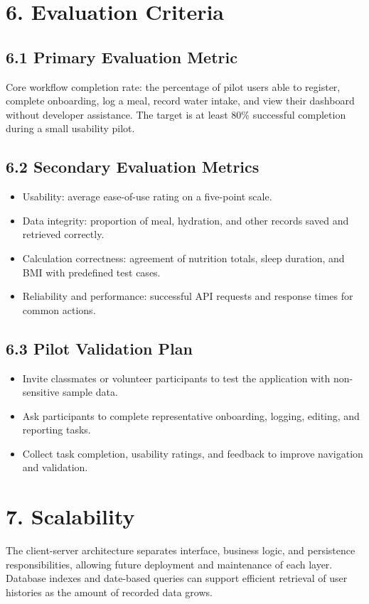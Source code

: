 \documentclass[11pt,a4paper]{article}
\begin{document}
\section*{6. Evaluation Criteria}
\subsection*{6.1 Primary Evaluation Metric}
Core workflow completion rate: the percentage of pilot users able to register, complete onboarding, log a meal, record water intake, and view their dashboard without developer assistance. The target is at least 80\% successful completion during a small usability pilot.

\subsection*{6.2 Secondary Evaluation Metrics}
\begin{itemize}
\item Usability: average ease-of-use rating on a five-point scale.
\item Data integrity: proportion of meal, hydration, and other records saved and retrieved correctly.
\item Calculation correctness: agreement of nutrition totals, sleep duration, and BMI with predefined test cases.
\item Reliability and performance: successful API requests and response times for common actions.
\end{itemize}
\subsection*{6.3 Pilot Validation Plan}
\begin{itemize}
\item Invite classmates or volunteer participants to test the application with non-sensitive sample data.
\item Ask participants to complete representative onboarding, logging, editing, and reporting tasks.
\item Collect task completion, usability ratings, and feedback to improve navigation and validation.
\end{itemize}
\section*{7. Scalability}
The client-server architecture separates interface, business logic, and persistence responsibilities, allowing future deployment and maintenance of each layer. Database indexes and date-based queries can support efficient retrieval of user histories as the amount of recorded data grows.
\end{document}
